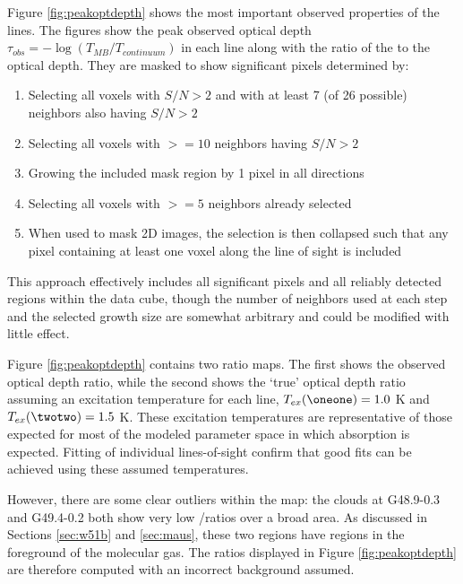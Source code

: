 Figure \ref{fig:peakoptdepth} shows the most important observed properties of
the \formaldehyde lines.  The figures show the peak observed optical depth
$\tau_{obs} = -\log(T_{MB}/T_{continuum})$ in each line along with the ratio of
the \oneone to the \twotwo optical depth.  They are masked to show significant
pixels determined by:
\begin{enumerate}
    \item Selecting all voxels with $S/N > 2$ and with at least 7 (of 26
        possible) neighbors also having $S/N > 2$
    \item Selecting all voxels with $>=10$ neighbors having $S/N > 2$
    \item Growing the included mask region by 1 pixel in all directions
    \item Selecting all voxels with $>=5$ neighbors already selected
    \item When used to mask 2D images, the selection is then collapsed such
        that any pixel containing at least one voxel along the line of sight is
        included
\end{enumerate}
This approach effectively includes all significant pixels and all reliably
detected regions within the data cube, though the number of neighbors used at
each step and the selected growth size are somewhat arbitrary and could be
modified with little effect.

Figure \ref{fig:peakoptdepth} contains two ratio maps.  The first shows the
observed optical depth ratio, while the second shows the `true' optical depth
ratio assuming an excitation temperature for each line, $T_{ex}(\oneone) = 1.0$
K and $T_{ex}(\twotwo) = 1.5$ K.  These excitation temperatures are
representative of those expected for most of the modeled parameter space in
which absorption is expected.  Fitting of individual lines-of-sight confirm
that good fits can be achieved using these assumed temperatures.

However, there are some clear outliers within the map: the clouds at G48.9-0.3
and G49.4-0.2 both show very low \oneone/\twotwo ratios over a broad area.  As
discussed in Sections \ref{sec:w51b} and \ref{sec:maus}, these two regions have
\hii regions in the foreground of the molecular gas.  The ratios displayed in
Figure \ref{fig:peakoptdepth} are therefore computed with an incorrect
background assumed.


